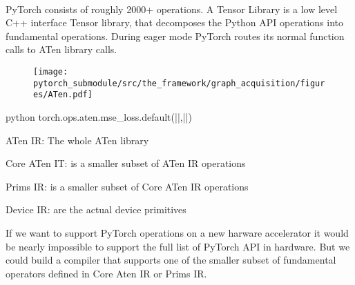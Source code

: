 \begin{defnbox}\nospacing
    \begin{defn}
        \label{defn:aten_a_tensor_library}\leavevmode\\
        \begin{minipage}{0.56\textwidth}
            PyTorch consists of roughly 2000+ operations.
            A Tensor Library is a low level C++ interface Tensor library, that decomposes the Python API operations into fundamental operations.
            During eager mode PyTorch routes its normal function calls to ATen library calls.
       \end{minipage}\hfil
        \begin{minipage}{0.4\textwidth}
            \begin{figure}[H]
                \centering
                \texttt{[image: pytorch\_submodule/src/the\_framework/graph\_acquisition/figures/ATen.pdf]}
            \end{figure}
        \end{minipage}
        \begin{mintlinebox}{python}
            torch.ops.aten.mse_loss.default(|\texttt{}|,|\texttt{}|)
        \end{mintlinebox}
        \begin{circlelistnosep}
            \item ATen IR: The whole ATen library
            \item Core ATen IT: is a smaller subset of ATen IR operations
            \item Prims IR: is a smaller subset of Core ATen IR operations
            \item Device IR: are the actual device primitives
        \end{circlelistnosep}
    \end{defn}
\end{defnbox}
\begin{questionbox}\nospacing
    If we want to support PyTorch operations on a new harware accelerator it would be nearly impossible to support the full list of PyTorch API in hardware.
    But we could build a compiler that supports one of the smaller subset of fundamental operators defined in Core Aten IR or Prims IR.
\end{questionbox}


